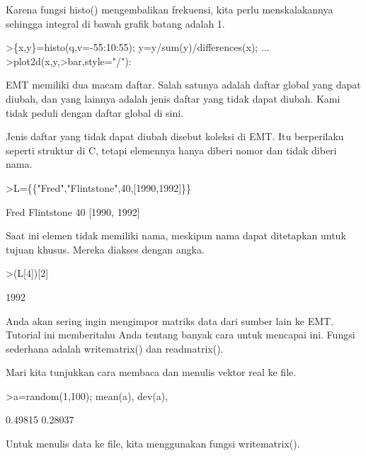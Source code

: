 \documentclass{article}
\begin{document}
\begin{eulernotebook}
\begin{eulercomment}
\begin{eulercomment}
\begin{eulercomment}
Karena fungsi histo() mengembalikan frekuensi, kita perlu
menskalakannya sehingga integral di bawah grafik batang adalah 1.
\end{eulercomment}
\begin{eulerprompt}
>\{x,y\}=histo(q,v=-55:10:55); y=y/sum(y)/differences(x); ...
>plot2d(x,y,>bar,style="/"):
\end{eulerprompt}
\begin{eulercomment}
EMT memiliki dua macam daftar. Salah satunya adalah daftar global yang
dapat diubah, dan yang lainnya adalah jenis daftar yang tidak dapat
diubah. Kami tidak peduli dengan daftar global di sini.

Jenis daftar yang tidak dapat diubah disebut koleksi di EMT. Itu
berperilaku seperti struktur di C, tetapi elemennya hanya diberi nomor
dan tidak diberi nama.
\end{eulercomment}
\begin{eulerprompt}
>L=\{\{"Fred","Flintstone",40,[1990,1992]\}\}
\end{eulerprompt}
\begin{euleroutput}
  Fred
  Flintstone
  40
  [1990,  1992]
\end{euleroutput}
\begin{eulercomment}
Saat ini elemen tidak memiliki nama, meskipun nama dapat ditetapkan
untuk tujuan khusus. Mereka diakses dengan angka.
\end{eulercomment}
\begin{eulerprompt}
>(L[4])[2]
\end{eulerprompt}
\begin{euleroutput}
  1992
\end{euleroutput}
\begin{eulercomment}
Anda akan sering ingin mengimpor matriks data dari sumber lain ke EMT.
Tutorial ini memberitahu Anda tentang banyak cara untuk mencapai ini.
Fungsi sederhana adalah writematrix() dan readmatrix().

Mari kita tunjukkan cara membaca dan menulis vektor real ke file.
\end{eulercomment}
\begin{eulerprompt}
>a=random(1,100); mean(a), dev(a),
\end{eulerprompt}
\begin{euleroutput}
  0.49815
  0.28037
\end{euleroutput}
\begin{eulercomment}
Untuk menulis data ke file, kita menggunakan fungsi writematrix().


\end{eulercomment}
\end{eulercomment}
\end{eulercomment}
\end{eulernotebook}
\end{document}
